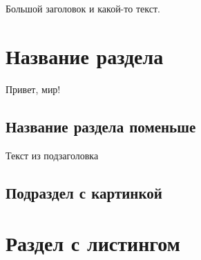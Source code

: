 
Большой заголовок и какой-то текст.

\newpage

\section{Название раздела}

Привет, мир!

\subsection{Название раздела поменьше}

Текст из подзаголовка

\subsection{Подраздел с картинкой}


\newpage

\section{Раздел с листингом}

\begin{spacing}{1.0}

\end{spacing}
